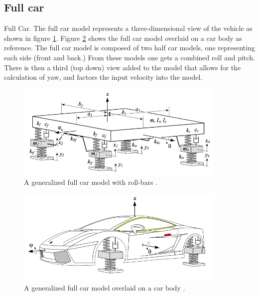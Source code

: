 \subsection{Full car}
Full Car. The full car model represents a three-dimensional view of the vehicle as shown in figure \ref{fig:full_car}. Figure \ref{fig:full_car_pretty} shows the full car model overlaid on a car body as reference. The full car model is composed of two half car models, one representing each side (front and back.) From these models one gets a combined roll and pitch. There is then a third (top down) view added to the model that allows for the calculation of yaw, and factors the input velocity into the model.

\begin{figure}[t]
	\centering
	\includegraphics[width=0.9\textwidth]{figures/full_car.png}
	\caption{A generalized full car model with roll-bars \cite{book:jazar}.}
	\label{fig:full_car}
\end{figure}

\begin{figure}[t]
	\centering
	\includegraphics[width=0.9\textwidth]{figures/full_car_pretty.png}
	\caption{A generalized full car model overlaid on a car body \cite{book:jazar}.}
	\label{fig:full_car_pretty}
\end{figure}

